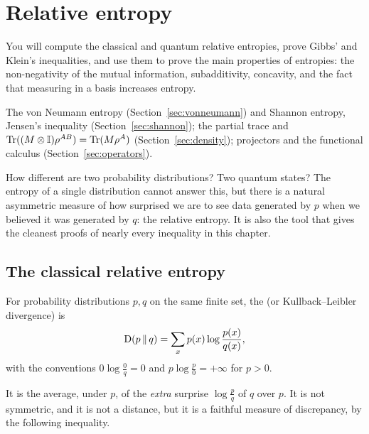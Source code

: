 \section{Relative entropy}\label{sec:relent}

\begin{objectives}
  You will compute the classical and quantum relative entropies, prove Gibbs' and Klein's inequalities, and use them to prove the main properties of entropies: the non-negativity of the mutual information, subadditivity, concavity, and the fact that measuring in a basis increases entropy.
\end{objectives}

\begin{recall}
  The von Neumann entropy (Section~\ref{sec:vonneumann}) and Shannon entropy, Jensen's inequality (Section~\ref{sec:shannon}); the partial trace and $\operatorname{Tr}((M\otimes\mathbb{I})\rho^{AB})=\operatorname{Tr}(M\rho^A)$ (Section~\ref{sec:density}); projectors and the functional calculus (Section~\ref{sec:operators}).
\end{recall}

How different are two probability distributions? Two quantum states? The entropy of a single distribution cannot answer this, but there is a natural asymmetric measure of how surprised we are to see data generated by $p$ when we believed it was generated by $q$: the relative entropy. It is also the tool that gives the cleanest proofs of nearly every inequality in this chapter.

\subsection{The classical relative entropy}

\begin{definition}\label{def:kl}
  For probability distributions $p,q$ on the same finite set, the  (or Kullback--Leibler divergence) is
  \[
    \mathrm{D}\!\left(p\,\middle\|\,q\right)=\sum_xp(x)\log\frac{p(x)}{q(x)},
  \]
  with the conventions $0\log\frac0q=0$ and $p\log\frac p0=+\infty$ for $p>0$.
\end{definition}

It is the average, under $p$, of the \emph{extra} surprise $\log\frac{p}{q}$ of $q$ over $p$. It is not symmetric, and it is not a distance, but it is a faithful measure of discrepancy, by the following inequality.

